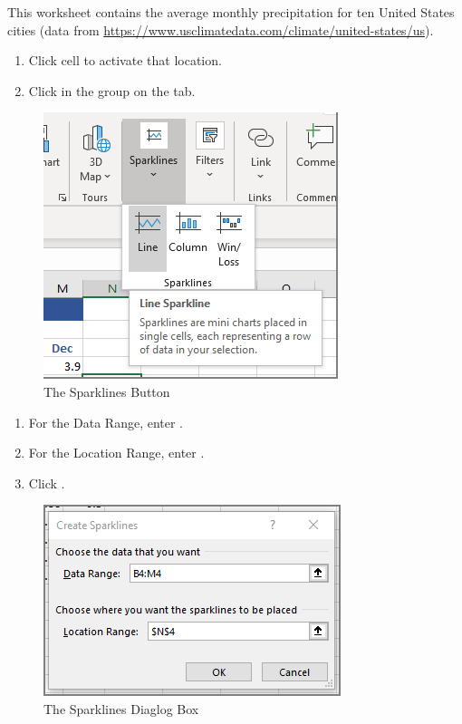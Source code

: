 This worksheet contains the average monthly precipitation for ten United States cities (data from  \url{https://www.usclimatedata.com/climate/united-states/us}).

\begin{enumerate}[resume]
	\item Click cell  to activate that location.
	\item Click  in the  group on the  tab.

\end{enumerate}

\begin{figure}[H]
	\centering
	\includegraphics[width=\maxwidth{.95\linewidth}]{gfx/ch08_fig01}
	\caption{The Sparklines Button}
	\label{08:fig01}
\end{figure}

\begin{enumerate}[resume]
		
	\item For the Data Range, enter .
	\item For the Location Range, enter .
	\item Click .
\end{enumerate}

\begin{figure}[H]
	\centering
	\includegraphics[width=\maxwidth{.95\linewidth}]{gfx/ch08_fig02}
	\caption{The Sparklines Diaglog Box}
	\label{08:fig02}
\end{figure}

